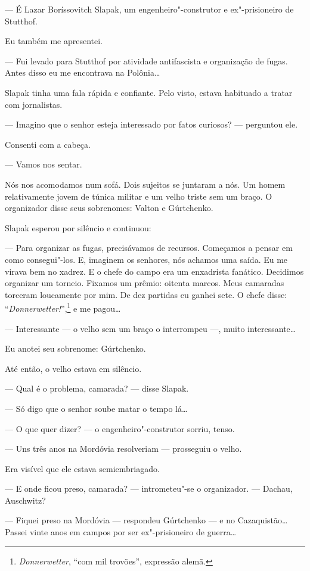 --- É Lazar Boríssovitch Slapak, um engenheiro"-construtor e
ex"-prisioneiro de Stutthof.

Eu também me apresentei.

--- Fui levado para Stutthof por atividade antifascista e organização de
fugas. Antes disso eu me encontrava na Polônia\ldots{}

Slapak tinha uma fala rápida e confiante. Pelo visto, estava habituado a
tratar com jornalistas.

--- Imagino que o senhor esteja interessado por fatos curiosos? ---
perguntou ele.

Consenti com a cabeça.

--- Vamos nos sentar.

Nós nos acomodamos num sofá. Dois sujeitos se juntaram a nós. Um homem
relativamente jovem de túnica militar e um velho triste sem um braço. O
organizador disse seus sobrenomes: Valton e Gúrtchenko.

Slapak esperou por silêncio e continuou:

--- Para organizar as fugas, precisávamos de recursos. Começamos a
pensar em como consegui"-los. E, imaginem os senhores, nós achamos uma
saída. Eu me virava bem no xadrez. E o chefe do campo era um enxadrista
fanático. Decidimos organizar um torneio. Fixamos um prêmio: oitenta
marcos. Meus camaradas torceram loucamente por mim. De dez partidas eu
ganhei sete. O chefe disse: ``\emph{Donnerwetter!}'',\footnote{\emph{Donnerwetter}, ``com
  mil trovões'', expressão alemã.} e me pagou\ldots{}

--- Interessante --- o velho sem um braço o interrompeu ---, muito
interessante\ldots{}

Eu anotei seu sobrenome: Gúrtchenko.

Até então, o velho estava em silêncio.

--- Qual é o problema, camarada? --- disse Slapak.

--- Só digo que o senhor soube matar o tempo lá\ldots{}

--- O que quer dizer? --- o engenheiro"-construtor sorriu, tenso.

--- Uns três anos na Mordóvia resolveriam --- prosseguiu o velho.

Era visível que ele estava semiembriagado.

--- E onde ficou preso, camarada? --- intrometeu"-se o organizador. ---
Dachau, Auschwitz?

--- Fiquei preso na Mordóvia --- respondeu Gúrtchenko --- e no
Cazaquistão\ldots{} Passei vinte anos em campos por ser ex"-prisioneiro de
guerra\ldots{}

